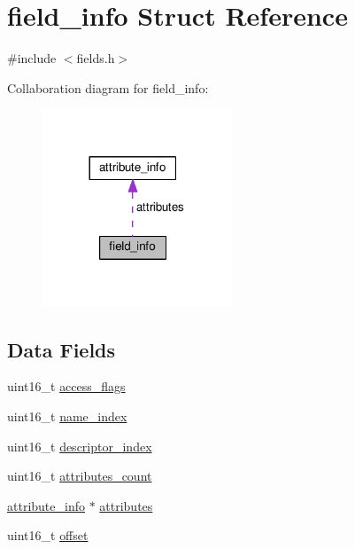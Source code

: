 \hypertarget{structfield__info}{}\section{field\+\_\+info Struct Reference}
\label{structfield__info}


{\ttfamily \#include $<$fields.\+h$>$}



Collaboration diagram for field\+\_\+info\+:\nopagebreak
\begin{figure}[H]
\begin{center}
\leavevmode
\includegraphics[width=161pt]{structfield__info__coll__graph}
\end{center}
\end{figure}
\subsection*{Data Fields}
\begin{DoxyCompactItemize}
\item 
uint16\+\_\+t \hyperlink{structfield__info_a97bcc8f6647cee71ea02bdd4183ba1da}{access\+\_\+flags}
\item 
uint16\+\_\+t \hyperlink{structfield__info_a3041f6a85347269c5253f7d377384b06}{name\+\_\+index}
\item 
uint16\+\_\+t \hyperlink{structfield__info_a56345eae0135047540b60ca34c91eb46}{descriptor\+\_\+index}
\item 
uint16\+\_\+t \hyperlink{structfield__info_a26aebef0abc97afef9e9a34701e6b550}{attributes\+\_\+count}
\item 
\hyperlink{structattribute__info}{attribute\+\_\+info} $\ast$ \hyperlink{structfield__info_afdda114944ae5eaae78c237f99257108}{attributes}
\item 
uint16\+\_\+t \hyperlink{structfield__info_ad6febfc2078ae2a35339d57079a28b3d}{offset}
\end{DoxyCompactItemize}


